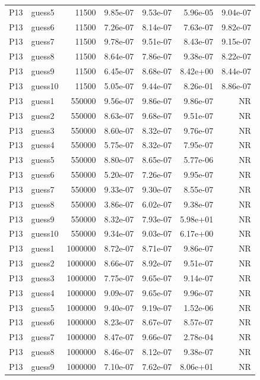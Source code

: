 {\begin{longtable}{llrrrrr}
P13 & guess5 & 11500 & 9.85e-07 & 9.53e-07 & 5.96e-05 & 9.04e-07 \\
P13 & guess6 & 11500 & 7.26e-07 & 8.14e-07 & 7.63e-07 & 9.82e-07 \\
P13 & guess7 & 11500 & 9.78e-07 & 9.51e-07 & 8.43e-07 & 9.15e-07 \\
P13 & guess8 & 11500 & 8.64e-07 & 7.86e-07 & 9.38e-07 & 8.22e-07 \\
P13 & guess9 & 11500 & 6.45e-07 & 8.68e-07 & 8.42e+00 & 8.44e-07 \\
P13 & guess10 & 11500 & 5.05e-07 & 9.44e-07 & 8.26e-01 & 8.86e-07 \\
P13 & guess1 & 550000 & 9.56e-07 & 9.86e-07 & 9.86e-07 & NR \\
P13 & guess2 & 550000 & 8.63e-07 & 9.68e-07 & 9.51e-07 & NR \\
P13 & guess3 & 550000 & 8.60e-07 & 8.32e-07 & 9.76e-07 & NR \\
P13 & guess4 & 550000 & 5.75e-07 & 8.32e-07 & 7.95e-07 & NR \\
P13 & guess5 & 550000 & 8.80e-07 & 8.65e-07 & 5.77e-06 & NR \\
P13 & guess6 & 550000 & 5.20e-07 & 7.26e-07 & 9.95e-07 & NR \\
P13 & guess7 & 550000 & 9.33e-07 & 9.30e-07 & 8.55e-07 & NR \\
P13 & guess8 & 550000 & 3.86e-07 & 6.02e-07 & 9.38e-07 & NR \\
P13 & guess9 & 550000 & 8.32e-07 & 7.93e-07 & 5.98e+01 & NR \\
P13 & guess10 & 550000 & 9.34e-07 & 9.03e-07 & 6.17e+00 & NR \\
P13 & guess1 & 1000000 & 8.72e-07 & 8.71e-07 & 9.86e-07 & NR \\
P13 & guess2 & 1000000 & 8.66e-07 & 8.92e-07 & 9.51e-07 & NR \\
P13 & guess3 & 1000000 & 7.75e-07 & 9.65e-07 & 9.14e-07 & NR \\
P13 & guess4 & 1000000 & 9.09e-07 & 9.65e-07 & 9.96e-07 & NR \\
P13 & guess5 & 1000000 & 9.40e-07 & 9.19e-07 & 1.52e-06 & NR \\
P13 & guess6 & 1000000 & 8.23e-07 & 8.67e-07 & 8.57e-07 & NR \\
P13 & guess7 & 1000000 & 8.47e-07 & 9.66e-07 & 2.78e-04 & NR \\
P13 & guess8 & 1000000 & 8.46e-07 & 8.12e-07 & 9.38e-07 & NR \\
P13 & guess9 & 1000000 & 7.10e-07 & 7.62e-07 & 8.06e+01 & NR \\

\end{longtable}}
